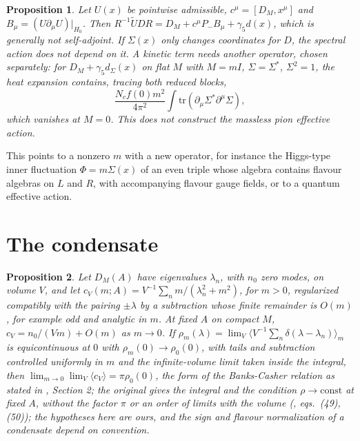 \documentclass[aps,prd,reprint,onecolumn,nofootinbib,amsmath,amssymb,floatfix]{revtex4-2}
\theoremstyle{plain}
\newtheorem{proposition}{Proposition}
\begin{document}
\begin{proposition}
Let $U(x)$ be pointwise admissible, $c^\mu=[D_M,x^\mu]$ and $B_\mu=(U\partial_\mu U)|_{H_0}$. Then $R^{-1}\tilde UDR=D_M+c^\mu P_-B_\mu+\gamma_5d(x)$, which is generally not self-adjoint. If $\Sigma(x)$ only changes coordinates for $D$, the spectral action does not depend on it. A kinetic term needs another operator, chosen separately: for $D_M+\gamma_5d_\Sigma(x)$ on flat $M$ with $M=mI$, $\Sigma=\Sigma^*$, $\Sigma^2=1$, the heat expansion contains, tracing both reduced blocks,
\begin{equation}
\frac{N_cf(0)m^2}{4\pi^2}\int\mathrm{tr}(\partial_\mu\Sigma^*\partial^\mu\Sigma),
\end{equation}
which vanishes at $M=0$. This does not construct the massless pion effective action.
\end{proposition}

This points to a nonzero $m$ with a new operator, for instance the Higgs-type inner fluctuation $\Phi=m\Sigma(x)$ of an even triple whose algebra contains flavour algebras on $L$ and $R$, with accompanying flavour gauge fields, or to a quantum effective action.

\section{The condensate}

\begin{proposition}
Let $D_M(A)$ have eigenvalues $\lambda_n$, with $n_0$ zero modes, on volume $V$, and let $c_V(m;A)=V^{-1}\sum_nm/(\lambda_n^2+m^2)$, for $m>0$, regularized compatibly with the pairing $\pm\lambda$ by a subtraction whose finite remainder is $O(m)$, for example odd and analytic in $m$. At fixed $A$ on compact $M$, $c_V=n_0/(Vm)+O(m)$ as $m\to0$. If $\rho_m(\lambda)=\lim_V\langle V^{-1}\sum_n\delta(\lambda-\lambda_n)\rangle_m$ is equicontinuous at $0$ with $\rho_m(0)\to\rho_0(0)$, with tails and subtraction controlled uniformly in $m$ and the infinite-volume limit taken inside the integral, then $\lim_{m\to0}\lim_V\langle c_V\rangle=\pi\rho_0(0)$, the form of the Banks-Casher relation as stated in \cite{GL2009}, Section 2; the original gives the integral and the condition $\rho\to\mathrm{const}$ at fixed $A$, without the factor $\pi$ or an order of limits with the volume (\cite{BC1980}, eqs.~(49), (50)); the hypotheses here are ours, and the sign and flavour normalization of a condensate depend on convention.
\end{proposition}
\end{document}
